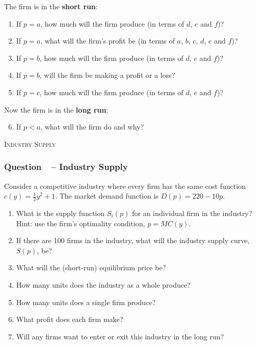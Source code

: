 \documentclass[12pt]{article}
\newcommand{\topic}[1]{\medskip\begin{center}\large\textsc{#1}\normalsize
  \end{center}}
\newcounter{question}[section]
\newcommand{\question}[1]{\refstepcounter{question}
  \subsubsection*{Question~\thequestion~-- #1}}
\newenvironment{subquestions}{
  \begin{enumerate}[label=(\roman*)]}{\end{enumerate}}
\begin{document}
The firm is in the \textbf{short run}:
\begin{subquestions}
  \item If $p=a$, how much will the firm produce (in terms of $d$, $e$ and $f$)?
  \item If $p=a$, what will the firm's profit be (in terms of $a$, $b$, $c$,
    $d$, $e$ and $f$)?
  \item If $p=b$, how much will the firm produce (in terms of $d$, $e$ and $f$)?
  \item If $p=b$, will the firm be making a profit or a loss?
  \item If $p=c$, how much will the firm produce (in terms of $d$, $e$ and $f$)?
\end{subquestions}
Now the firm is in the \textbf{long run}:
\begin{subquestions}
  \setcounter{enumi}{5}
  \item If $p<a$, what will the firm do and why?
\end{subquestions}

\newpage
\topic{Industry Supply}
\question{Industry Supply}
Consider a competitive industry where every firm has the same cost function
$c\left( y \right)=\frac{1}{2}y^2+1$. The market demand function is 
$D\left( p \right) = 220 - 10p$.
\begin{subquestions}
  \item What is the supply function $S_i\left( p \right)$ for an individual
    firm in the industry? Hint: use the firm's optimality condition,
    $p=MC\left( y \right)$.
  \item If there are 100 firms in the industry, what will the industry supply
    curve, $S\left( p \right)$, be?
  \item What will the (short-run) equilibrium price be?
  \item How many units does the industry as a whole produce?
  \item How many units does a single firm produce?
  \item What profit does each firm make?
  \item Will any firms want to enter or exit this industry in the long run?
\end{subquestions}
\end{document}
